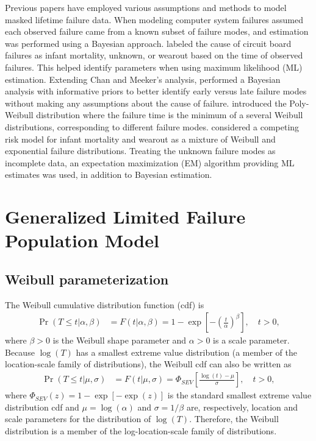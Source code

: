 \documentclass[12pt]{article}
\begin{document}
Previous papers have employed various assumptions and methods to model masked lifetime failure data.  When modeling computer system failures \citet{reiser} assumed each observed failure came from a known subset of failure modes, and estimation was performed using a Bayesian approach.  \cite{chan} labeled the cause of circuit board failures as infant mortality, unknown, or wearout based on the time of observed failures.  This helped identify parameters when using maximum likelihood (ML) estimation.  Extending Chan and Meeker's analysis, \citet{basu} performed a Bayesian analysis with informative priors to better identify early versus late failure modes without making any assumptions about the cause of failure.  \cite{berger} introduced the Poly-Weibull distribution where the failure time is the minimum of a several Weibull distributions, corresponding to different failure modes.  \cite{ranjan} considered a competing risk model for infant mortality and wearout as a mixture of Weibull and exponential failure distributions.  Treating the unknown failure modes as incomplete data, an expectation maximization (EM) algorithm providing ML estimates was used, in addition to Bayesian estimation.


\section{Generalized Limited Failure Population Model}
\label{sec:GLFP model}

\subsection{Weibull parameterization}
\label{sec:Weibull parameterization}
The Weibull cumulative
 distribution function (cdf) is
\begin{align}
\label{equation:weibull.cdf}
\Pr(T \leq t|\alpha,\beta ) &= F(t|\alpha,\beta)=1-
\exp \left [-\left (\frac{t}{\alpha} \right )^{\beta}
\right ], \quad t > 0,
\end{align}
where $\beta>0$ is the Weibull shape parameter and $\alpha>0$ is a
scale parameter. Because $\log(T)$ has a smallest extreme value
distribution (a member of the location-scale family of
distributions), the Weibull cdf can also be written as
\begin{align*}
\Pr(T \leq t| \mu,\sigma ) &= F(t| \mu,\sigma)= \Phi_{SEV}\left[\frac{\log(t)-\mu}{\sigma}\right], \quad t > 0,
\end{align*}
where $\Phi_{SEV}(z)=1-\exp[-\exp(z)]$ is the standard smallest extreme value
distribution cdf and
$\mu=\log(\alpha)$ and $\sigma=1/\beta$ are, respectively, location
and scale parameters for the distribution of $\log(T)$. Therefore, the Weibull
distribution is a member of the log-location-scale family of
distributions.
\end{document}
